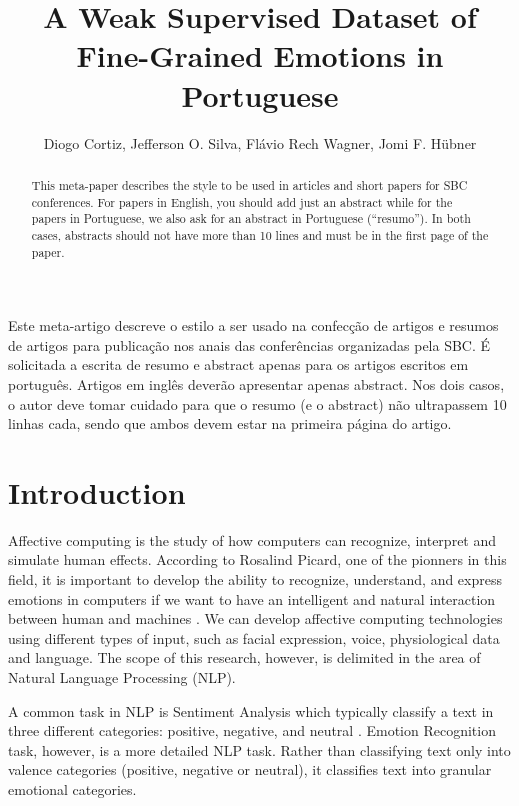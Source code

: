 \documentclass[12pt]{article}
\title{A Weak Supervised Dataset of Fine-Grained Emotions in Portuguese}
\author{Diogo Cortiz\inst{1,2}, Jefferson O. Silva\inst{2}, Flávio Rech
  Wagner\inst{2}, Jomi F. Hübner\inst{3} }
\begin{document}
\maketitle

\begin{abstract}
  This meta-paper describes the style to be used in articles and short papers
  for SBC conferences. For papers in English, you should add just an abstract
  while for the papers in Portuguese, we also ask for an abstract in
  Portuguese (``resumo''). In both cases, abstracts should not have more than
  10 lines and must be in the first page of the paper.
\end{abstract}

\begin{resumo}
  Este meta-artigo descreve o estilo a ser usado na confecção de artigos e
  resumos de artigos para publicação nos anais das conferências organizadas
  pela SBC. É solicitada a escrita de resumo e abstract apenas para os artigos
  escritos em português. Artigos em inglês deverão apresentar apenas abstract.
  Nos dois casos, o autor deve tomar cuidado para que o resumo (e o abstract)
  não ultrapassem 10 linhas cada, sendo que ambos devem estar na primeira
  página do artigo.
\end{resumo}


\section{Introduction}

Affective computing is the study of how computers can recognize, interpret and simulate human effects. According to Rosalind Picard, one of the pionners in this field, it is important to develop the ability to recognize, understand, and express emotions in computers if we want to have an intelligent and natural interaction between human and machines \cite{Rosalind2000}. We can develop affective computing technologies using different types of input, such as facial expression, voice, physiological data and language. The scope of this research, however, is delimited in the area of Natural Language Processing (NLP).

A common task in NLP is Sentiment Analysis which typically classify a text in three different categories: positive, negative, and neutral \cite{Drus2019}. Emotion Recognition task, however, is a more detailed NLP task. Rather than classifying text only into valence categories (positive, negative or neutral), it classifies text into granular emotional categories.
\end{document}
